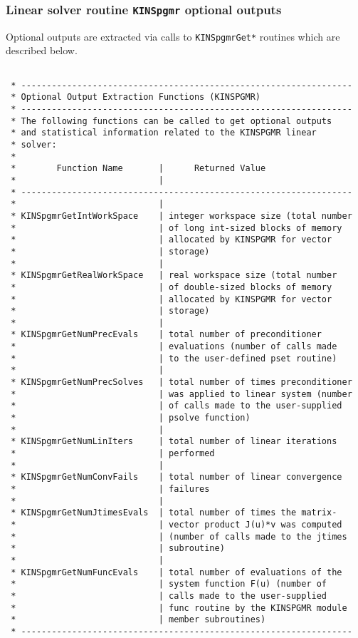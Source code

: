 \documentclass[11pt]{article}
\begin{document}
\subsubsection{Linear solver routine {\tt KINSpgmr} optional outputs}

Optional outputs are extracted via calls to {\tt KINSpgmrGet*} routines
which are described below.
\small
\begin{verbatim}

 * -----------------------------------------------------------------
 * Optional Output Extraction Functions (KINSPGMR)
 * -----------------------------------------------------------------
 * The following functions can be called to get optional outputs
 * and statistical information related to the KINSPGMR linear
 * solver:
 *
 *        Function Name       |      Returned Value
 *                            |
 * -----------------------------------------------------------------
 *                            |
 * KINSpgmrGetIntWorkSpace    | integer workspace size (total number
 *                            | of long int-sized blocks of memory
 *                            | allocated by KINSPGMR for vector
 *                            | storage)
 *                            |
 * KINSpgmrGetRealWorkSpace   | real workspace size (total number
 *                            | of double-sized blocks of memory
 *                            | allocated by KINSPGMR for vector
 *                            | storage)
 *                            |
 * KINSpgmrGetNumPrecEvals    | total number of preconditioner
 *                            | evaluations (number of calls made
 *                            | to the user-defined pset routine)
 *                            |
 * KINSpgmrGetNumPrecSolves   | total number of times preconditioner
 *                            | was applied to linear system (number
 *                            | of calls made to the user-supplied
 *                            | psolve function)
 *                            |
 * KINSpgmrGetNumLinIters     | total number of linear iterations
 *                            | performed
 *                            |
 * KINSpgmrGetNumConvFails    | total number of linear convergence
 *                            | failures
 *                            |
 * KINSpgmrGetNumJtimesEvals  | total number of times the matrix-
 *                            | vector product J(u)*v was computed
 *                            | (number of calls made to the jtimes
 *                            | subroutine)
 *                            |
 * KINSpgmrGetNumFuncEvals    | total number of evaluations of the
 *                            | system function F(u) (number of
 *                            | calls made to the user-supplied
 *                            | func routine by the KINSPGMR module
 *                            | member subroutines)
 * -----------------------------------------------------------------


\end{verbatim}
\end{document}

